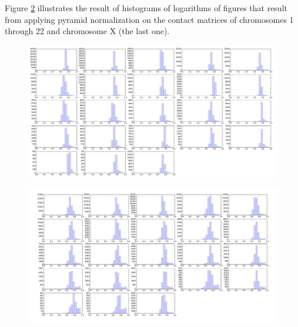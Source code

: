 \documentclass{article}
\begin{document}
Figure \ref{fig:pyr_hist_1mb} illustrates the result of histograms of
logarithms of figures that result from applying pyramid normalization
on the contact matrices of chromosomes
1 through 22 and chromosome X (the last one).
\begin{landscape}
    \begin{figure}[H]
        \centering
        \includegraphics[width=1.5\textwidth]{figures/pearson_hist.png}
        \caption{}
        \label{fig:pearson_hist}
    \end{figure}

\begin{figure}[H]
    \centering
    \includegraphics[width=1.5\textwidth]{figures/pyr_hist_1mb.png}
    \caption{}
    \label{fig:pyr_hist_1mb}
\end{figure}
\end{landscape}
\end{document}
